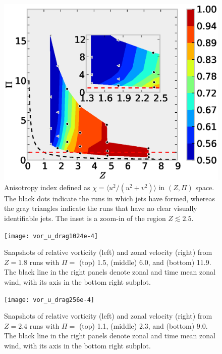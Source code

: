 \documentclass{jfm}
\begin{document}
\begin{figure}
\begin{center}
\includegraphics[width=6in]{anisotropic_index}\caption{Anisotropy index defined as $\chi=\langle u^{2}/(u^{2}+v^{2})\rangle$
in $(Z,\Pi)$ space. The black dots indicate the runs in which
jets have formed, whereas the gray triangles indicate the runs that have
no clear visually identifiable jets. The inset is a zoom-in of the
region $Z\apprle2.5$.}
\label{anisotropic_index}
\end{center}
\end{figure}


\begin{figure}
\begin{center}
\texttt{[image: vor\_u\_drag1024e-4]}\caption{Snapshots of relative vorticity (left) and zonal velocity (right)
from $Z=1.8$ runs with $\Pi=$ (top) 1.5, (middle) 6.0, and (bottom)
11.9. The black line in the right panels denote zonal and time mean
zonal wind, with its axis in the bottom right subplot.}
\label{vor_u_snapshot_drag1024e-4}
\end{center}
\end{figure}


\begin{figure}
\begin{center}
\texttt{[image: vor\_u\_drag256e-4]}\caption{Snapshots of relative vorticity (left) and zonal velocity (right)
from $Z=2.4$ runs with $\Pi=$ (top) 1.1, (middle) 2.3, and (bottom)
9.0. The black line in the right panels denote zonal and time mean
zonal wind, with its axis in the bottom right subplot.}
\label{vor_u_snapshot_drag256e-4}
\end{center}
\end{figure}
\end{document}
